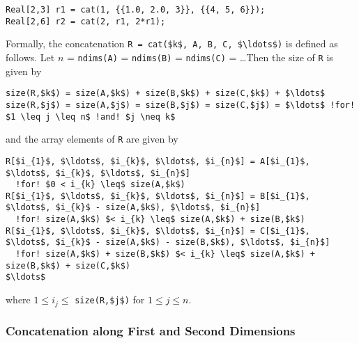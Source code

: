 \begin{example}
\begin{lstlisting}[language=modelica]
Real[2,3] r1 = cat(1, {{1.0, 2.0, 3}}, {{4, 5, 6}});
Real[2,6] r2 = cat(2, r1, 2*r1);
\end{lstlisting}
\end{example}

Formally, the concatenation \lstinline!R = cat($k$, A, B, C, $\ldots$)! is defined as follows.  Let $n$ = \lstinline!ndims(A)! = \lstinline!ndims(B)! = \lstinline!ndims(C)! = \ldots  Then the size of \lstinline!R! is given by
\begin{lstlisting}[language=modelica,escapechar=!,frame=none,xleftmargin=1em]
size(R,$k$) = size(A,$k$) + size(B,$k$) + size(C,$k$) + $\ldots$
size(R,$j$) = size(A,$j$) = size(B,$j$) = size(C,$j$) = $\ldots$ !for! $1 \leq j \leq n$ !and! $j \neq k$
\end{lstlisting}
and the array elements of \lstinline!R! are given by
\begin{lstlisting}[language=modelica,escapechar=!,frame=none,xleftmargin=1em]
R[$i_{1}$, $\ldots$, $i_{k}$, $\ldots$, $i_{n}$] = A[$i_{1}$, $\ldots$, $i_{k}$, $\ldots$, $i_{n}$]
  !for! $0 < i_{k} \leq$ size(A,$k$)
R[$i_{1}$, $\ldots$, $i_{k}$, $\ldots$, $i_{n}$] = B[$i_{1}$, $\ldots$, $i_{k}$ - size(A,$k$), $\ldots$, $i_{n}$]
  !for! size(A,$k$) $< i_{k} \leq$ size(A,$k$) + size(B,$k$)
R[$i_{1}$, $\ldots$, $i_{k}$, $\ldots$, $i_{n}$] = C[$i_{1}$, $\ldots$, $i_{k}$ - size(A,$k$) - size(B,$k$), $\ldots$, $i_{n}$]
  !for! size(A,$k$) + size(B,$k$) $< i_{k} \leq$ size(A,$k$) + size(B,$k$) + size(C,$k$)
$\ldots$
\end{lstlisting}
where $1 \leq i_{j} \leq$ \lstinline!size(R,$j$)! for $1 \leq j \leq n$.


\subsubsection{Concatenation along First and Second Dimensions}\label{array-concatenation-along-first-and-second-dimensions}\label{concatenation-along-first-and-second-dimensions}

